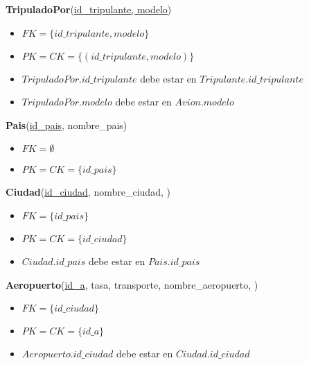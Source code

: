 \vspace*{0.1cm}
\noindent
\textbf{TripuladoPor}(\underline{id\_tripulante, modelo})
\begin{itemize}[noitemsep]
	\item $FK = \{id\_tripulante, modelo\}$
	\item $PK = CK = \{(id\_tripulante, modelo)\}$
	\item $TripuladoPor.id\_tripulante$ debe estar en
		$Tripulante.id\_tripulante$
	\item $TripuladoPor.modelo$ debe estar en $Avion.modelo$
\end{itemize}

\vspace*{0.1cm}
\noindent
\textbf{Pais}(\underline{id\_pais}, nombre\_pais)
\begin{itemize}[noitemsep]
	\item $FK = \emptyset$
	\item $PK = CK = \{id\_pais\}$
\end{itemize}

\noindent
\textbf{Ciudad}(\underline{id\_ciudad}, nombre\_ciudad, )
\begin{itemize}[noitemsep]
	\item $FK = \{id\_pais\}$
	\item $PK = CK = \{id\_ciudad\}$
	\item $Ciudad.id\_pais$ debe estar en $Pais.id\_pais$
\end{itemize}

\vspace*{0.1cm}
\noindent
\textbf{Aeropuerto}(\underline{id\_a}, tasa, transporte, 
			nombre\_aeropuerto, )
\begin{itemize}[noitemsep]
	\item $FK = \{id\_ciudad\}$
	\item $PK = CK = \{id\_a\}$
	\item $Aeropuerto.id\_ciudad$ debe estar en $Ciudad.id\_ciudad$
\end{itemize}

  


